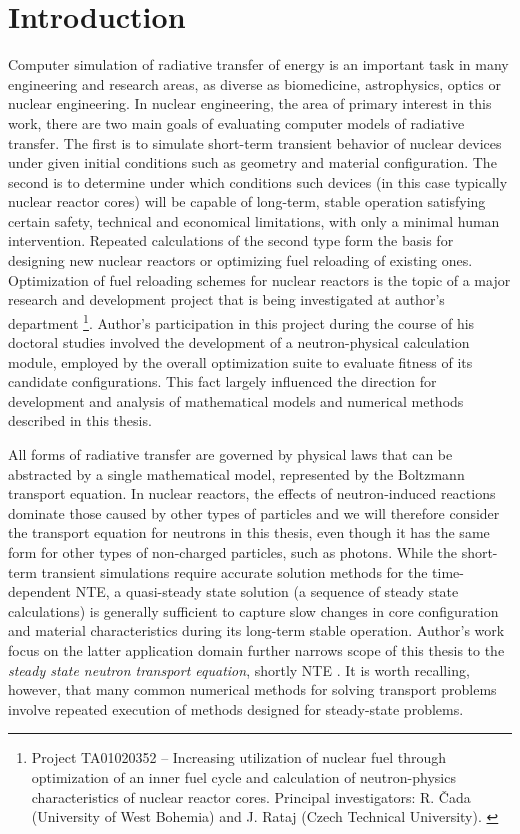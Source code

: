\chapter{Introduction}

Computer simulation of radiative transfer of energy is an important task in many engineering and research areas, as
diverse as biomedicine, astrophysics, optics or nuclear engineering. In nuclear engineering, the area of primary
interest in this work, there are two main goals of evaluating computer models of radiative transfer. The first is
to simulate short-term transient behavior of nuclear devices under given initial conditions such as geometry and material
configuration. The second is to determine under which conditions such devices (in this case typically nuclear reactor
cores) will be capable of long-term, stable operation satisfying certain safety, technical and economical limitations,
with only a minimal human intervention. Repeated calculations of the second type form the basis for designing new
nuclear reactors or optimizing fuel reloading of existing ones. Optimization of fuel reloading schemes for nuclear
reactors is the topic of a major research and development project that is being investigated at author's department
\footnote{Project TA01020352 -- Increasing utilization of nuclear fuel through optimization of an inner fuel cycle and
calculation of neutron-physics characteristics of nuclear reactor cores. Principal investigators: R. {\v C}ada
(University of West Bohemia) and J. Rataj (Czech Technical University). \label{ftn:TACR}}.
Author's participation in this project during the course of his doctoral studies involved the development of a
neutron-physical calculation module, employed by the overall optimization suite to evaluate fitness of its candidate
configurations. This fact largely influenced the direction for development and analysis of mathematical models and
numerical methods described in this thesis.

All forms of radiative transfer are governed by physical laws that can be abstracted by a single mathematical model,
represented by the Boltzmann transport equation. In nuclear reactors, the effects of neutron-induced reactions dominate
those caused by other types of particles and we will therefore consider the transport equation for neutrons in this
thesis, even though it has the same form for other types of non-charged particles, such as photons. While the short-term
transient simulations require accurate solution methods for the time-dependent NTE, a quasi-steady state solution (a
sequence of steady state calculations) is generally sufficient to capture slow changes in core configuration and
material characteristics during its long-term stable operation.
Author's work focus on the latter application domain further narrows scope of this thesis to the \textit{steady state
neutron transport equation}, shortly NTE . It is worth recalling, however, that many common numerical methods
for solving transport problems involve repeated execution of methods designed for steady-state problems.

